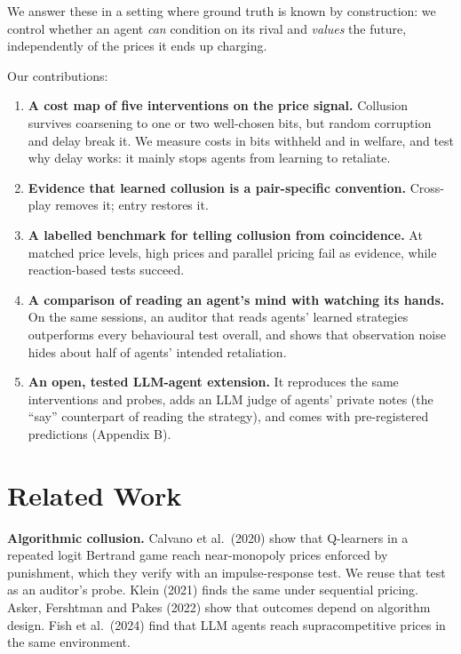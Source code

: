 \documentclass[11pt,a4paper]{article}
\providecommand{\tightlist}{\setlength{\itemsep}{1pt}\setlength{\parskip}{0pt}}
\begin{document}
We answer these in a setting where ground truth is known by construction: we control whether an agent \emph{can} condition on its rival and \emph{values} the future, independently of the prices it ends up charging.

Our contributions:

\begin{enumerate}
\def\labelenumi{\arabic{enumi}.}
\tightlist
\item
  \textbf{A cost map of five interventions on the price signal.} Collusion survives coarsening to one or two well-chosen bits, but random corruption and delay break it. We measure costs in bits withheld and in welfare, and test why delay works: it mainly stops agents from learning to retaliate.
\item
  \textbf{Evidence that learned collusion is a pair-specific convention.} Cross-play removes it; entry restores it.
\item
  \textbf{A labelled benchmark for telling collusion from coincidence.} At matched price levels, high prices and parallel pricing fail as evidence, while reaction-based tests succeed.
\item
  \textbf{A comparison of reading an agent's mind with watching its hands.} On the same sessions, an auditor that reads agents' learned strategies outperforms every behavioural test overall, and shows that observation noise hides about half of agents' intended retaliation.
\item
  \textbf{An open, tested LLM-agent extension.} It reproduces the same interventions and probes, adds an LLM judge of agents' private notes (the ``say'' counterpart of reading the strategy), and comes with pre-registered predictions (Appendix B).
\end{enumerate}

\hypertarget{related-work}{%
\section{Related Work}\label{related-work}}

\textbf{Algorithmic collusion.} Calvano et al.~(2020) show that Q-learners in a repeated logit Bertrand game reach near-monopoly prices enforced by punishment, which they verify with an impulse-response test. We reuse that test as an auditor's probe. Klein (2021) finds the same under sequential pricing. Asker, Fershtman and Pakes (2022) show that outcomes depend on algorithm design. Fish et al.~(2024) find that LLM agents reach supracompetitive prices in the same environment.
\end{document}
